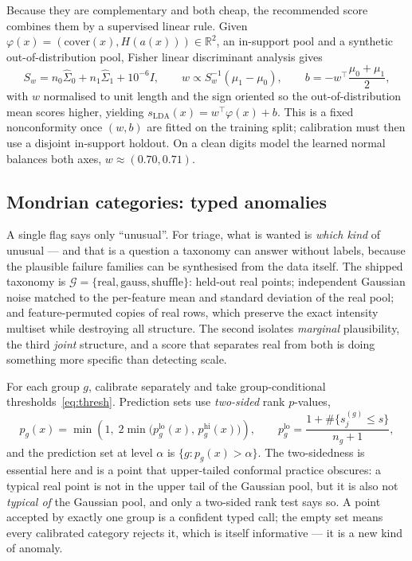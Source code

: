 \documentclass[12pt]{iopart}
\theoremstyle{definition}
\theoremstyle{plain}
\theoremstyle{remark}
\newcommand{\R}{\mathbb{R}}
\begin{document}
Because they are complementary and both cheap, the recommended score combines
them by a supervised linear rule. Given $\varphi(x)=(\mathrm{cover}(x),H(a(x)))
\in\R^2$, an in-support pool and a synthetic out-of-distribution pool, Fisher
linear discriminant analysis gives
\begin{equation}
\label{eq:lda}
S_w = n_0\widehat\Sigma_0+n_1\widehat\Sigma_1+10^{-6}I,
\qquad
w \propto S_w^{-1}(\mu_1-\mu_0),
\qquad
b = -w^\top\frac{\mu_0+\mu_1}{2},
\end{equation}
with $w$ normalised to unit length and the sign oriented so the
out-of-distribution mean scores higher, yielding
$s_{\mathrm{LDA}}(x)=w^\top\varphi(x)+b$. This is a fixed nonconformity once
$(w,b)$ are fitted on the training split; calibration must then use a disjoint
in-support holdout. On a clean digits model the learned normal balances both
axes, $w\approx(0.70,0.71)$.

\subsection{Mondrian categories: typed anomalies}
\label{sec:mondrian}

A single flag says only ``unusual''. For triage, what is wanted is
\emph{which kind} of unusual --- and that is a question a taxonomy can answer
without labels, because the plausible failure families can be synthesised from
the data itself. The shipped taxonomy is
$\mathcal{G}=\{\text{real},\text{gauss},\text{shuffle}\}$: held-out real points;
independent Gaussian noise matched to the per-feature mean and standard
deviation of the real pool; and feature-permuted copies of real rows, which
preserve the exact intensity multiset while destroying all structure. The
second isolates \emph{marginal} plausibility, the third \emph{joint} structure,
and a score that separates real from both is doing something more specific than
detecting scale.

For each group $g$, calibrate separately and take group-conditional
thresholds~\eqref{eq:thresh}. Prediction sets use \emph{two-sided} rank
$p$-values,
\begin{equation}
\label{eq:twosided}
p_g(x) = \min\!\left(1,\;
2\min\!\bigl(p^{\mathrm{lo}}_g(x),\,p^{\mathrm{hi}}_g(x)\bigr)\right),
\qquad
p^{\mathrm{lo}}_g = \frac{1+\#\{s^{(g)}_j\le s\}}{n_g+1},
\end{equation}
and the prediction set at level $\alpha$ is $\{g: p_g(x)>\alpha\}$. The
two-sidedness is essential here and is a point that upper-tailed conformal
practice obscures: a typical real point is not in the upper tail of the
Gaussian pool, but it is also not \emph{typical of} the Gaussian pool, and only
a two-sided rank test says so. A point accepted by exactly one group is a
confident typed call; the empty set means every calibrated category rejects it,
which is itself informative --- it is a new kind of anomaly.
\end{document}
